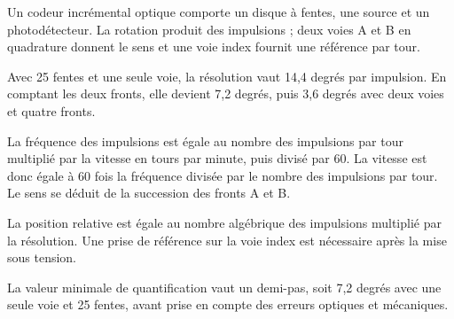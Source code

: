 \begin{corrigebox}
Un codeur incrémental optique comporte un disque à fentes, une source et un photodétecteur. La rotation produit des impulsions ; deux voies A et B en quadrature donnent le sens et une voie index fournit une référence par tour.

Avec 25 fentes et une seule voie, la résolution vaut 14,4 degrés par impulsion. En comptant les deux fronts, elle devient 7,2 degrés, puis 3,6 degrés avec deux voies et quatre fronts.

La fréquence des impulsions est égale au nombre des impulsions par tour multiplié par la vitesse en tours par minute, puis divisé par 60. La vitesse est donc égale à 60 fois la fréquence divisée par le nombre des impulsions par tour. Le sens se déduit de la succession des fronts A et B.

La position relative est égale au nombre algébrique des impulsions multiplié par la résolution. Une prise de référence sur la voie index est nécessaire après la mise sous tension.

La valeur minimale de quantification vaut un demi-pas, soit 7,2 degrés avec une seule voie et 25 fentes, avant prise en compte des erreurs optiques et mécaniques.
\end{corrigebox}
